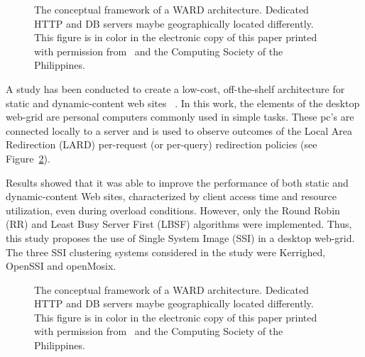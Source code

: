 \documentclass[preprint]{acm_proc_article-sp}
\begin{document}
\begin{figure}[htb]
        \centering
        \caption{The conceptual framework of a WARD architecture. Dedicated HTTP and DB servers maybe geographically located differently. This figure is in color in the electronic copy of this paper printed with permission from~\citet{derobles11} and the Computing Society of the Philippines.}
        \label{ward}
\end{figure}

A study has been conducted to create a low-cost, off-the-shelf architecture for static and dynamic-content web sites ~\citep{derobles11}. In this work, the elements of the desktop web-grid are personal computers commonly used in simple tasks. These pc's are connected locally to a server and is used to observe outcomes of the Local Area Redirection (LARD) per-request (or per-query) redirection policies (see Figure~\ref{webgrid}).

Results showed that it was able to improve the performance of both static and dynamic-content Web sites, characterized by client access time and resource utilization, even during overload conditions. However, only the Round Robin (RR) and Least Busy Server First (LBSF) algorithms were implemented. Thus, this study proposes the use of Single System Image (SSI) in a desktop web-grid. The three SSI clustering systems considered in the study were Kerrighed, OpenSSI and openMosix.

\begin{figure}[htb]
        \centering
        \caption{The conceptual framework of a WARD architecture. Dedicated HTTP and DB servers maybe geographically located differently. This figure is in color in the electronic copy of this paper printed with permission from~\citet{derobles11} and the Computing Society of the Philippines.}
        \label{webgrid}
\end{figure}
\end{document}

